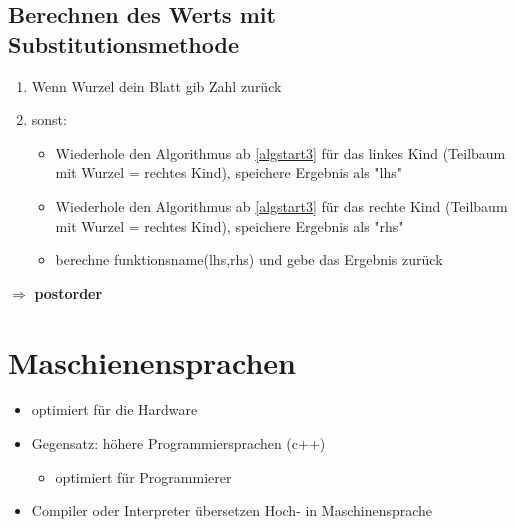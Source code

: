 \documentclass[a4paper]{scrartcl}
\begin{document}
\subsection{Berechnen des Werts mit Substitutionsmethode}
\label{sec-6-6}
\begin{enumerate}
\item \label{algstart3} Wenn Wurzel dein Blatt gib Zahl zurück
\item sonst:
\begin{itemize}
\item Wiederhole den Algorithmus ab \ref{algstart3} für das linkes Kind (Teilbaum mit Wurzel = rechtes Kind), speichere Ergebnis als "lhs"
\item Wiederhole den Algorithmus ab \ref{algstart3} für das rechte Kind (Teilbaum mit Wurzel = rechtes Kind), speichere Ergebnis als "rhs"
\item berechne funktionsname(lhs,rhs) und gebe das Ergebnis zurück
\end{itemize}
\end{enumerate}
$\Rightarrow$ \textbf{postorder}
\section{Maschienensprachen}
\label{sec-7}
\begin{itemize}
\item optimiert für die Hardware
\item Gegensatz: höhere Programmiersprachen (c++)
\begin{itemize}
\item optimiert für Programmierer
\end{itemize}
\item Compiler oder Interpreter übersetzen Hoch- in Maschinensprache
\end{itemize}
\end{document}
